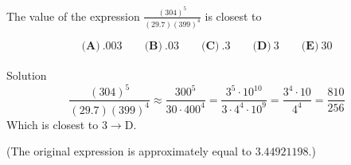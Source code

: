 

The value of the expression $ \frac{(304)^5}{(29.7)(399)^4}$ is closest to

\[ \textbf{(A)}\ .003 \qquad
\textbf{(B)}\ .03 \qquad
\textbf{(C)}\ .3 \qquad
\textbf{(D)}\ 3 \qquad
\textbf{(E)}\ 30
\]
\\
Solution
\\
\[\frac{(304)^5}{(29.7)(399)^4} \approx \frac{300^5}{30\cdot400^4} = \frac{3^5 \cdot 10^{10}}{3\cdot 4^4 \cdot 10^9} = \frac{3^4\cdot 10}{4^4} = \frac{810}{256}\] Which is closest to $3\rightarrow\boxed{\text{D}}$.

(The original expression is approximately equal to $3.44921198$.)